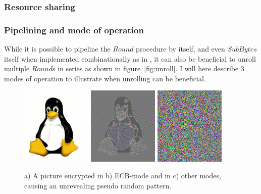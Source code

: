 \subsubsection{Resource sharing}

\subsubsection{Pipelining and mode of operation}

While it is possible to pipeline the $Round$ procedure by itself, and
even $SubBytes$ itself when implemented combinationally as in
\cite{csbox}, it can also be beneficial to unroll multiple $Round$s in
series as shown in figure~\ref{fig:unroll}. I will here describe 3
modes of operation to illustrate when unrolling can be beneficial.

\begin{figure}[htbb]
  \subfigure{\label{fig:ecbpicta}}
  \includegraphics[width=0.3\textwidth]{tux.jpeg}
  \subfigure{\label{fig:ecbpictb}}
  \includegraphics[width=0.3\textwidth]{tux_ecb.jpeg}
  \subfigure{\label{fig:ecbpictc}}
  \includegraphics[width=0.3\textwidth]{noise.png}
  \caption{a) A picture encrypted in b) ECB-mode and in c) other
    modes, causing an unrevealing pseudo random pattern.}
  \label{fig:ecbpict}
\end{figure}

